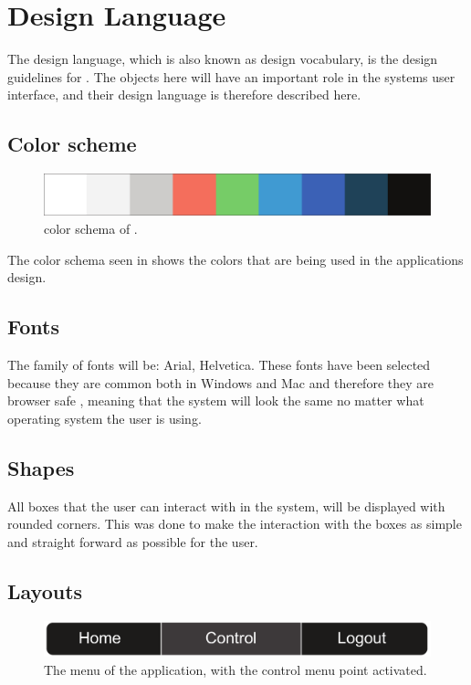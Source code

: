 \chapter{Design Language}
The design language, which is also known as design vocabulary, is the design guidelines for \projectname{}. 
The objects here will have an important role in the systems user interface, and their design language is therefore described here.

\section{Color scheme}
\begin{figure}[htb]
    \centering
    \includegraphics[width=\textwidth]{gfx/color_schema.pdf}
    \caption{color schema of \projectname{}.}
    \label{fig:color_schema}
\end{figure}

The color schema seen in  shows the colors that are being used in the applications design. 

\section{Fonts}
The family of fonts will be: Arial, Helvetica. 
These fonts have been selected because they are common both in Windows and Mac and therefore they are browser safe \cite{common_fonts}, meaning that the system will look the same no matter what operating system the user is using.

\section{Shapes}
All boxes that the user can interact with in the system, will be displayed with rounded corners.
This was done to make the interaction with the boxes as simple and straight forward as possible for the user.

\section{Layouts}
\begin{figure}[htb]
    \centering
    \includegraphics[width=\textwidth]{gfx/menu.pdf}
    \caption{The menu of the application, with the control menu point activated.}
    \label{fig:menu_design}
\end{figure}

